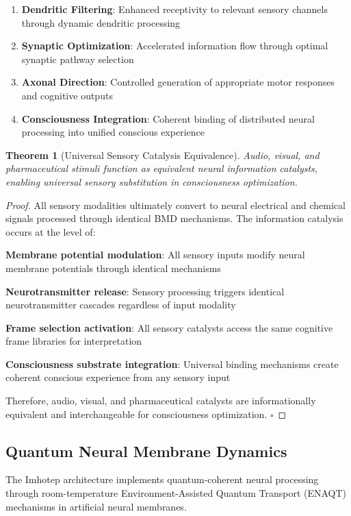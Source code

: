 \documentclass[12pt,a4paper]{article}
\newtheorem{theorem}{Theorem}[section]
\theoremstyle{remark}
\begin{document}
\begin{enumerate}
\item \textbf{Dendritic Filtering}: Enhanced receptivity to relevant sensory channels through dynamic dendritic processing
\item \textbf{Synaptic Optimization}: Accelerated information flow through optimal synaptic pathway selection
\item \textbf{Axonal Direction}: Controlled generation of appropriate motor responses and cognitive outputs
\item \textbf{Consciousness Integration}: Coherent binding of distributed neural processing into unified conscious experience
\end{enumerate}

\begin{theorem}[Universal Sensory Catalysis Equivalence]
Audio, visual, and pharmaceutical stimuli function as equivalent neural information catalysts, enabling universal sensory substitution in consciousness optimization.
\end{theorem}

\begin{proof}
All sensory modalities ultimately convert to neural electrical and chemical signals processed through identical BMD mechanisms. The information catalysis occurs at the level of:

\textbf{Membrane potential modulation}: All sensory inputs modify neural membrane potentials through identical mechanisms

\textbf{Neurotransmitter release}: Sensory processing triggers identical neurotransmitter cascades regardless of input modality

\textbf{Frame selection activation}: All sensory catalysts access the same cognitive frame libraries for interpretation

\textbf{Consciousness substrate integration}: Universal binding mechanisms create coherent conscious experience from any sensory input

Therefore, audio, visual, and pharmaceutical catalysts are informationally equivalent and interchangeable for consciousness optimization. $\square$
\end{proof}

\subsection{Quantum Neural Membrane Dynamics}

The Imhotep architecture implements quantum-coherent neural processing through room-temperature Environment-Assisted Quantum Transport (ENAQT) mechanisms in artificial neural membranes.
\end{document}
